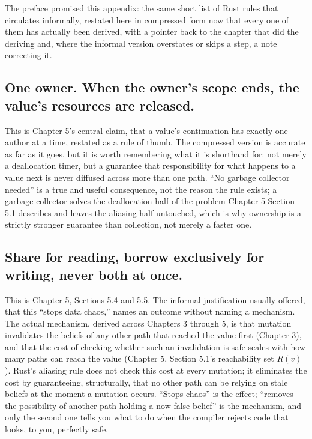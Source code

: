 \documentclass[11pt]{book}
\begin{document}
The preface promised this appendix: the same short list of Rust rules that circulates informally, restated here in compressed form now that every one of them has actually been derived, with a pointer back to the chapter that did the deriving and, where the informal version overstates or skips a step, a note correcting it.

\subsection*{One owner. When the owner's scope ends, the value's resources are released.}

This is Chapter 5's central claim, that a value's continuation has exactly one author at a time, restated as a rule of thumb. The compressed version is accurate as far as it goes, but it is worth remembering what it is shorthand for: not merely a deallocation timer, but a guarantee that responsibility for what happens to a value next is never diffused across more than one path. ``No garbage collector needed'' is a true and useful consequence, not the reason the rule exists; a garbage collector solves the deallocation half of the problem Chapter 5 Section 5.1 describes and leaves the aliasing half untouched, which is why ownership is a strictly stronger guarantee than collection, not merely a faster one.

\subsection*{Share for reading, borrow exclusively for writing, never both at once.}

This is Chapter 5, Sections 5.4 and 5.5. The informal justification usually offered, that this ``stops data chaos,'' names an outcome without naming a mechanism. The actual mechanism, derived across Chapters 3 through 5, is that mutation invalidates the beliefs of any other path that reached the value first (Chapter 3), and that the cost of checking whether such an invalidation is safe scales with how many paths can reach the value (Chapter 5, Section 5.1's reachability set $R(v)$). Rust's aliasing rule does not check this cost at every mutation; it eliminates the cost by guaranteeing, structurally, that no other path can be relying on stale beliefs at the moment a mutation occurs. ``Stops chaos'' is the effect; ``removes the possibility of another path holding a now-false belief'' is the mechanism, and only the second one tells you what to do when the compiler rejects code that looks, to you, perfectly safe.
\end{document}
